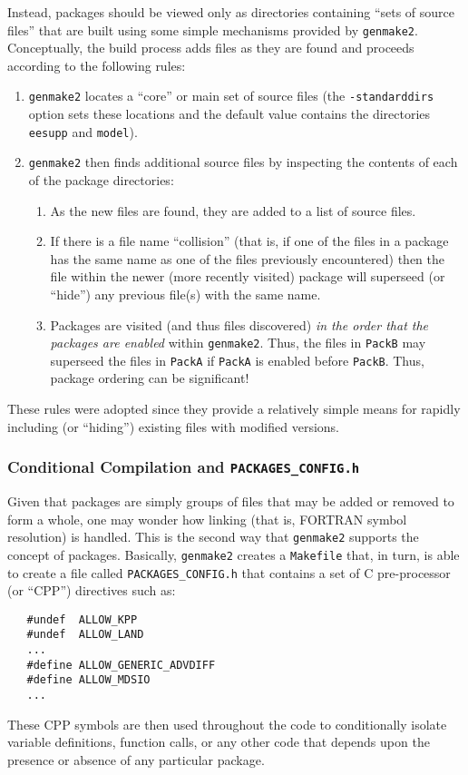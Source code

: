 Instead, packages should be viewed only as directories containing
``sets of source files'' that are built using some simple mechanisms
provided by \texttt{genmake2}.  Conceptually, the build process adds
files as they are found and proceeds according to the following rules:
\begin{enumerate}
\item \texttt{genmake2} locates a ``core'' or main set of source files
  (the \texttt{-standarddirs} option sets these locations and the
  default value contains the directories \texttt{eesupp} and
  \texttt{model}).
  
\item \texttt{genmake2} then finds additional source files by
  inspecting the contents of each of the package directories:
  \begin{enumerate}
  \item As the new files are found, they are added to a list of source
    files.

  \item If there is a file name ``collision'' (that is, if one of the
    files in a package has the same name as one of the files
    previously encountered) then the file within the newer (more
    recently visited) package will superseed (or ``hide'') any
    previous file(s) with the same name.

  \item Packages are visited (and thus files discovered) {\it in the
      order that the packages are enabled} within \texttt{genmake2}.
    Thus, the files in \texttt{PackB} may superseed the files in
    \texttt{PackA} if \texttt{PackA} is enabled before
    \texttt{PackB}.  Thus, package ordering can be significant!
  \end{enumerate}
\end{enumerate}

These rules were adopted since they provide a relatively simple means
for rapidly including (or ``hiding'') existing files with modified
versions.

\subsubsection{Conditional Compilation and \texttt{PACKAGES\_CONFIG.h}}

Given that packages are simply groups of files that may be added or
removed to form a whole, one may wonder how linking (that is, FORTRAN
symbol resolution) is handled.  This is the second way that
\texttt{genmake2} supports the concept of packages.  Basically,
\texttt{genmake2} creates a \texttt{Makefile} that, in turn, is able
to create a file called \texttt{PACKAGES\_CONFIG.h} that contains a set
of C pre-processor (or ``CPP'') directives such as:
\begin{verbatim}
   #undef  ALLOW_KPP
   #undef  ALLOW_LAND
   ...
   #define ALLOW_GENERIC_ADVDIFF
   #define ALLOW_MDSIO
   ...
\end{verbatim}
These CPP symbols are then used throughout the code to conditionally
isolate variable definitions, function calls, or any other code that
depends upon the presence or absence of any particular package.

